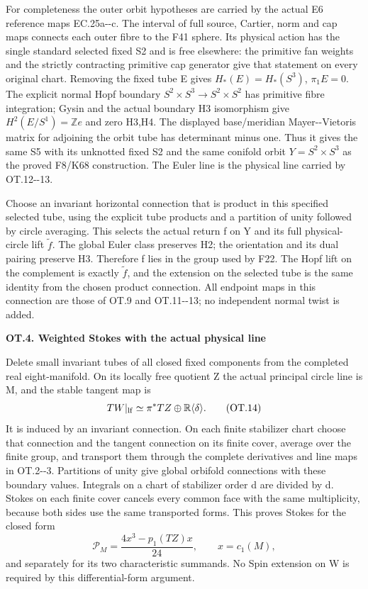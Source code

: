 For completeness the outer orbit hypotheses are carried by the
actual E6 reference maps EC.25a-\/-c. The interval of full source,
Cartier, norm and cap maps connects each outer fibre to the F41
sphere. Its physical action has the single standard selected
fixed S2 and is free elsewhere: the primitive fan weights and
the strictly contracting primitive cap generator give that
statement on every original chart. Removing the fixed tube E
gives \(H_*(E)=H_*(S^3)\), \(\pi_1E=0\). The explicit normal
Hopf boundary \(S^2\times S^3\to S^2\times S^2\) has primitive
fibre integration; Gysin and the actual boundary H3 isomorphism
give \(H^2(E/S^1)=\mathbb Ze\) and zero H3,H4. The displayed
base/meridian Mayer-\/-Vietoris matrix for adjoining the orbit tube
has determinant minus one. Thus it gives the same S5 with its
unknotted fixed S2 and the same conifold orbit \(Y=S^2\times S^3\)
as the proved F8/K68 construction. The Euler line is the physical
line carried by OT.12-\/-13.

Choose an invariant horizontal connection that is product in
this specified selected tube, using the explicit tube products
and a partition of unity followed by circle averaging. This
selects the actual return f on Y and its full physical-circle
lift \(\widetilde f\). The global Euler class preserves H2;
the orientation and its dual pairing preserve H3. Therefore
f lies in the group used by F22. The Hopf lift on the complement
is exactly \(\widetilde f\), and the extension on the selected
tube is the same identity from the chosen product connection.
All endpoint maps in this connection are those of OT.9 and
OT.11-\/-13; no independent normal twist is added.

\par

\medskip\noindent\textbf{OT.4. Weighted Stokes with the actual physical line}

\par\nobreak

Delete small invariant tubes of all closed fixed components from
the completed real eight-manifold. On its locally free quotient Z
the actual principal circle line is M, and the stable tangent map
is
\[
TW|_{\rm lf}\simeq\pi^*TZ\oplus\mathbb R\langle\delta\rangle.
                                                               \tag{OT.14}
\]
It is induced by an invariant connection. On each finite
stabilizer chart choose that connection and the tangent connection
on its finite cover, average over the finite group, and transport
them through the complete derivatives and line maps in OT.2-\/-3.
Partitions of unity give global orbifold connections with these
boundary values. Integrals on a chart of stabilizer order d are
divided by d. Stokes on each finite cover cancels every common
face with the same multiplicity, because both sides use the same
transported forms. This proves Stokes for the closed form
\[
\mathcal P_M=\frac{4x^3-p_1(TZ)x}{24},\qquad x=c_1(M),   \tag{OT.15}
\]
and separately for its two characteristic summands. No Spin
extension on W is required by this differential-form argument.

